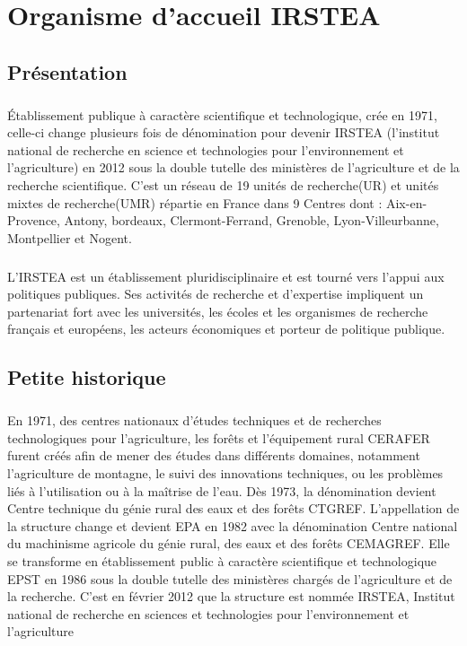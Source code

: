 \chapter{Organisme d’accueil IRSTEA}
\section{Présentation}
\paragraph{}
Établissement publique à caractère scientifique et technologique, crée en 1971, celle-ci change plusieurs fois de dénomination pour devenir IRSTEA (l’institut national de recherche en science et technologies pour l'environnement et l'agriculture) en 2012 sous la double tutelle des ministères de l’agriculture et de la recherche scientifique. C’est  un réseau de 19 unités de recherche(UR) et unités mixtes de recherche(UMR) répartie en France dans 9 Centres dont : Aix-en-Provence, Antony, bordeaux, Clermont-Ferrand, Grenoble, Lyon-Villeurbanne, Montpellier et Nogent. 
\paragraph{}
L’IRSTEA est un établissement pluridisciplinaire et est tourné vers l’appui aux politiques publiques. Ses activités de recherche et d’expertise impliquent un partenariat fort avec les universités, les écoles et les organismes de recherche français et européens, les acteurs économiques et porteur de politique publique. 

\section{Petite historique}
\paragraph{}	
En 1971, des centres nationaux d’études techniques et de recherches technologiques pour l’agriculture, les forêts et l’équipement rural \gls{CERAFER} furent créés afin de mener des études dans différents domaines, notamment l’agriculture de montagne, le suivi des innovations techniques, ou les problèmes liés à l’utilisation ou à la maîtrise de l’eau. Dès 1973, la dénomination devient Centre technique du génie rural des eaux et des forêts \gls{CTGREF}.
\newline
L’appellation de la structure change et devient \gls{EPA} en 1982 avec la dénomination Centre national du machinisme agricole du génie rural, des eaux et des forêts \gls{CEMAGREF}. Elle se transforme en établissement public à caractère scientifique et technologique \gls{EPST} en 1986 sous la double tutelle des ministères chargés de l’agriculture et de la recherche. C’est en février 2012 que la structure est nommée IRSTEA, Institut national de recherche en sciences et technologies pour l’environnement et l’agriculture

